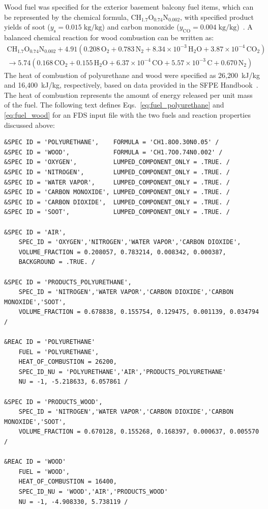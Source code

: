 \documentclass[12pt,oneside]{book}
\renewcommand{\C}{\mbox{C}}
\renewcommand{\H}{\mbox{H}}
\renewcommand{\O}{\mbox{O}}
\newcommand{\N}{\mbox{N}}
\begin{document}
\clearpage


Wood fuel was specified for the exterior basement balcony fuel items, which can be represented by the chemical formula, $\C\H_{1.7}\O_{0.74}\N_{0.002}$, with specified product yields of soot ($y_{\mathrm{s}}=0.015 \; \mathrm{kg}/\mathrm{kg}$) and carbon monoxide ($y_{\mathrm{CO}}=0.004 \; \mathrm{kg}/\mathrm{kg}$)~\cite{SFPE:Tewarson}. A balanced chemical reaction for wood combustion can be written as:
\begin{multline}
\C\H_{1.7}\O_{0.74}\N_{0.002} + 4.91(0.208\,\O_{2} + 0.783\,\N_{2} + 8.34 \times 10^{-3}\,\H_{2}\O + 3.87 \times 10^{-4}\,\C\O_{2}) \\
\rightarrow 5.74(0.168\,\C\O_{2} + 0.155\,\H_{2}\O + 6.37 \times 10^{-4}\,\C\O + 5.57 \times 10^{-3}\,\C + 0.670\,\N_{2})
\label{eq:fuel_wood}
\end{multline}
The heat of combustion of polyurethane and wood were specified as 26,200~kJ/kg and 16,400~kJ/kg, respectively, based on data provided in the SFPE Handbook~\cite{SFPE:Tewarson}. The heat of combustion represents the amount of energy released per unit mass of the fuel. The following text defines Eqs.~\ref{eq:fuel_polyurethane} and \ref{eq:fuel_wood} for an FDS input file with the two fuels and reaction properties discussed above:

\begin{lstlisting}[basicstyle=\ttfamily\scriptsize]
&SPEC ID = 'POLYURETHANE',    FORMULA = 'CH1.8O0.30N0.05' /
&SPEC ID = 'WOOD',            FORMULA = 'CH1.7O0.74N0.002' /
&SPEC ID = 'OXYGEN',          LUMPED_COMPONENT_ONLY = .TRUE. /
&SPEC ID = 'NITROGEN',        LUMPED_COMPONENT_ONLY = .TRUE. /
&SPEC ID = 'WATER VAPOR',     LUMPED_COMPONENT_ONLY = .TRUE. /
&SPEC ID = 'CARBON MONOXIDE', LUMPED_COMPONENT_ONLY = .TRUE. /
&SPEC ID = 'CARBON DIOXIDE',  LUMPED_COMPONENT_ONLY = .TRUE. /
&SPEC ID = 'SOOT',            LUMPED_COMPONENT_ONLY = .TRUE. /

&SPEC ID = 'AIR',
    SPEC_ID = 'OXYGEN','NITROGEN','WATER VAPOR','CARBON DIOXIDE',
    VOLUME_FRACTION = 0.208057, 0.783214, 0.008342, 0.000387,
    BACKGROUND = .TRUE. /

&SPEC ID = 'PRODUCTS_POLYURETHANE',
    SPEC_ID = 'NITROGEN','WATER VAPOR','CARBON DIOXIDE','CARBON MONOXIDE','SOOT',
    VOLUME_FRACTION = 0.678838, 0.155754, 0.129475, 0.001139, 0.034794 /

&REAC ID = 'POLYURETHANE'
    FUEL = 'POLYURETHANE',
    HEAT_OF_COMBUSTION = 26200,
    SPEC_ID_NU = 'POLYURETHANE','AIR','PRODUCTS_POLYURETHANE'
    NU = -1, -5.218633, 6.057861 /

&SPEC ID = 'PRODUCTS_WOOD',
    SPEC_ID = 'NITROGEN','WATER VAPOR','CARBON DIOXIDE','CARBON MONOXIDE','SOOT',
    VOLUME_FRACTION = 0.670128, 0.155268, 0.168397, 0.000637, 0.005570 /

&REAC ID = 'WOOD'
    FUEL = 'WOOD',
    HEAT_OF_COMBUSTION = 16400,
    SPEC_ID_NU = 'WOOD','AIR','PRODUCTS_WOOD'
    NU = -1, -4.908330, 5.738119 /
\end{lstlisting}
\end{document}
